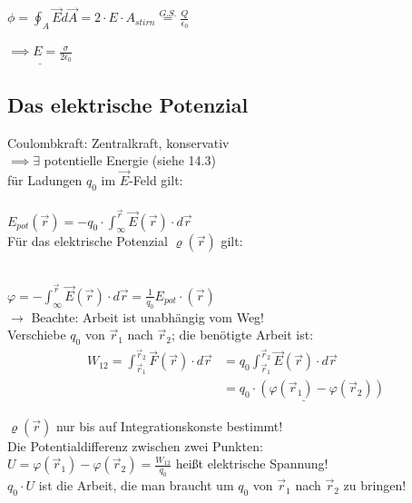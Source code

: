 \documentclass[11pt]{article}
\begin{document}
$ \phi=\oint_{A} \vec{E}d\vec{A}=2\cdot E\cdot A_{stirn}\overset{G.S.}{=}\frac{Q}{\epsilon_0}$ 

$ \underline{\implies E=\frac{\sigma}{2\epsilon_0}} $

\subsection{Das elektrische Potenzial}

Coulombkraft: Zentralkraft, konservativ\\
$\implies \exists$ potentielle Energie (siehe 14.3)\\
für Ladungen $q_0$ im $\vec{E}$-Feld gilt:\\

\hfill\\
$\boxed{\displaystyle E_{pot}(\vec{r})=-q_0\cdot\int_{\infty}^{\vec{r}} \vec{E}(\vec{r})\cdot d\vec{r}}$
\hfill\\

Für das elektrische Potenzial $ \varrho(\vec{r}) $ gilt:

\hfill\\
$\boxed{\displaystyle\varphi=-\int_{\infty}^{\vec{r}} \vec{E}(\vec{r})\cdot d\vec{r} = \frac{1}{q_0}E_{pot}\cdot (\vec{r})}$
\hfill\\

$\rightarrow$ Beachte: Arbeit ist unabhängig vom Weg!\\
Verschiebe $q_0$ von $\vec{r}_1$ nach $\vec{r}_2$; die benötigte Arbeit ist:\\

\begin{align*}
	\displaystyle W_{12}= \int_{\vec{r}_1}^{\vec{r}_2} \vec{F}(\vec{r})\cdot d\vec{r} & = q_0\int_{\vec{r}_1}^{\vec{r}_2} \vec{E}(\vec{r})\cdot d\vec{r} \\
	&\underline{ =q_0\cdot(\varphi(\vec{r}_1)-\varphi(\vec{r}_2))}
\end{align*}

$ \varrho(\vec{r}) $ nur bis auf Integrationskonste bestimmt!\\
Die Potentialdifferenz zwischen zwei Punkten:\\

$ U = \varphi(\vec{r}_1)-\varphi(\vec{r}_2) = \frac{W_{12}}{q_0}$ heißt elektrische Spannung!\\

$q_0\cdot U$ ist die Arbeit, die man braucht um $q_0$ von $ \vec{r}_1 $ nach $ \vec{r}_2 $ zu bringen!\\
\end{document}
